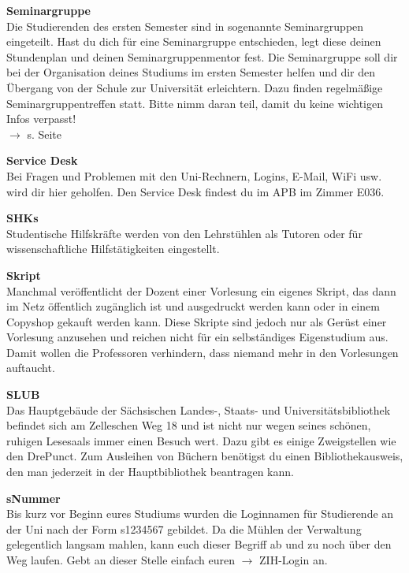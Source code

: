 \begin{multicols}{2}
\textbf{Seminargruppe} \\
Die Studierenden des ersten Semester sind in sogenannte Seminargruppen eingeteilt. Hast du dich für eine Seminargruppe entschieden, legt diese deinen Stundenplan und deinen Seminargruppenmentor fest. Die Se\-mi\-nar\-grup\-pe soll dir bei der Organisation deines Studiums im ersten Semester helfen und dir den Übergang von der Schule zur Universität erleichtern. Dazu finden regelmäßige Seminargruppentreffen statt. Bitte nimm daran teil, damit du keine wichtigen Infos verpasst! \\
$\rightarrow$ s. Seite \pageref{sec:seminargruppen}

\textbf{Service Desk} \\
Bei Fragen und Problemen mit den Uni-Rechnern, Logins, E-Mail, WiFi usw. wird dir hier geholfen. Den Service Desk findest du im APB im Zimmer E036.

\textbf{SHKs} \\
Studentische Hilfskräfte werden von den Lehrstühlen als Tutoren oder für wissenschaftliche Hilfstätigkeiten eingestellt.

\textbf{Skript} \\
Manchmal veröffentlicht der Dozent einer Vorlesung ein eigenes Skript, das dann im Netz öffentlich zugänglich ist und ausgedruckt werden kann oder in einem Copyshop gekauft werden kann.
Diese Skripte sind jedoch nur als Gerüst einer Vorlesung anzusehen und reichen nicht für ein selbständiges Eigenstudium aus.
Damit wollen die Professoren verhindern, dass niemand mehr in den Vorlesungen auftaucht.

\textbf{SLUB} \\
Das Hauptgebäude der Sächsischen Landes-, Staats- und Universitätsbibliothek   befindet sich am Zelleschen Weg 18 und ist nicht nur wegen seines schönen, ruhigen Lesesaals immer einen Besuch wert.
Dazu gibt es einige Zweigstellen wie den DrePunct.
Zum Ausleihen von Büchern benötigst du einen Bibliothekausweis, den man jederzeit in der Hauptbibliothek beantragen kann.

\textbf{sNummer} \\
Bis kurz vor Beginn eures Studiums wurden die Loginnamen für Studierende an der
Uni nach der Form s1234567 gebildet. Da die Mühlen der Verwaltung gelegentlich
langsam mahlen, kann euch dieser Begriff ab und zu noch über den Weg laufen.
Gebt an dieser Stelle einfach euren $\rightarrow$ ZIH-Login an.

\vfill\columnbreak


\end{multicols}
